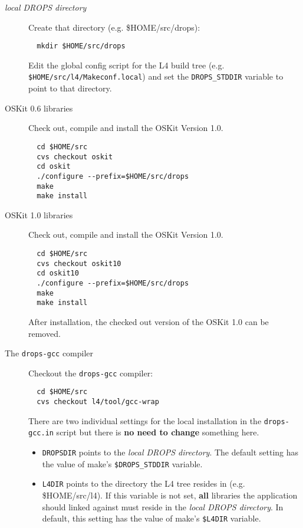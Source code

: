 \documentclass[twocolumn,10pt]{article}
\begin{document}
\begin{description}
\item[\textsl{local DROPS directory}]
  Create that directory (e.g. \$HOME/src/drops):
\begin{verbatim}
  mkdir $HOME/src/drops
\end{verbatim}
  Edit the global config script for the L4 build tree 
  (e.g. \texttt{\$HOME/src/l4/Makeconf.local}) and set
  the \texttt{DROPS\_STDDIR} variable to point to that
  directory.

\item[OSKit 0.6 libraries]
Check out, compile and install the OSKit Version 1.0.
\begin{verbatim}
  cd $HOME/src
  cvs checkout oskit
  cd oskit
  ./configure --prefix=$HOME/src/drops
  make
  make install
\end{verbatim}

\item[OSKit 1.0 libraries]
Check out, compile and install the OSKit Version 1.0.
\begin{verbatim}
  cd $HOME/src
  cvs checkout oskit10
  cd oskit10
  ./configure --prefix=$HOME/src/drops
  make
  make install
\end{verbatim}

After installation, the checked out version of the OSKit 1.0 can
be removed.

\item[The \texttt{drops-gcc} compiler]
Checkout the \texttt{drops-gcc} compiler:
\begin{verbatim}
  cd $HOME/src
  cvs checkout l4/tool/gcc-wrap
\end{verbatim}
There are two individual settings for the local installation in
the \texttt{drops-gcc.in} script but there is \textbf{no need to change}
something here.

\begin{itemize}
\item \texttt{DROPSDIR} points to the \textsl{local DROPS directory}.
  The default setting has the value of make's \texttt{\$DROPS\_STDDIR}
  variable.
\item \texttt{L4DIR} points to the directory the L4 tree resides in 
  (e.g. \$HOME/src/l4). If this variable is not set, \textbf{all} 
  libraries the application should linked against must reside in the 
  \textsl{local DROPS directory}. In default, this setting has the
  value of make's \texttt{\$L4DIR} variable.
\end{itemize}


\end{description}
\end{document}
